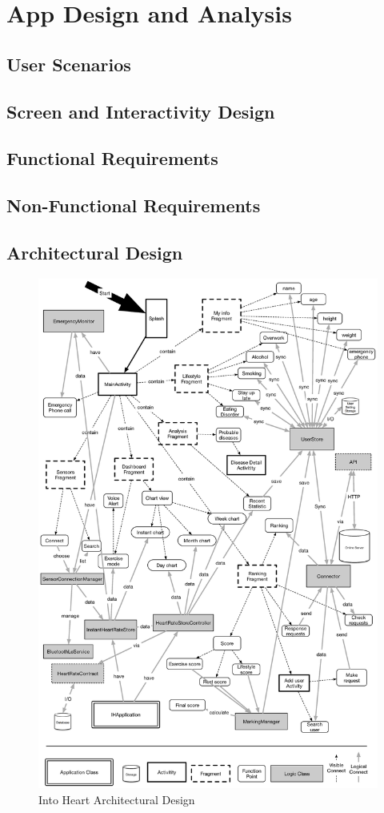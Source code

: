 \documentclass[10pt,a4paper,final]{scrartcl}
\begin{document}
\section{App Design and Analysis}
\subsection{User Scenarios}
	
\subsection{Screen and Interactivity Design}
	
\subsection{Functional Requirements}
	
\subsection{Non-Functional Requirements}
	
\subsection{Architectural Design}
\begin{figure}[H]
\centering
\includegraphics[width=5.3in]{img/arch.eps}
\caption{Into Heart Architectural Design}
\label{fig:arch}
\end{figure}
\end{document}
